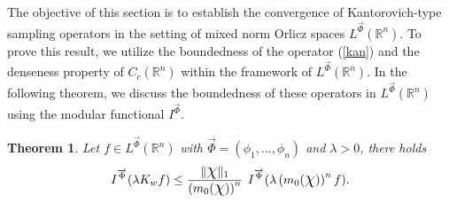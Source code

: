 \documentclass[11pt, a4paper]{article}
\newtheorem{thm}{Theorem}[section]
\theoremstyle{definition}
\numberwithin{equation}{section}
\def\RR{\mathbb R}
\def\Chi{\mbox{\Large$\chi$}}
\begin{document}
The objective of this section is to establish the convergence of Kantorovich-type sampling operators  in the setting of  mixed norm Orlicz spaces $L^{ \overrightarrow{\Phi}}(\RR^n)$. 
To prove this result, we utilize the boundedness of the operator (\ref{kan}) and the denseness property of $C_c(\RR^n)$ within the framework of $L^{ \overrightarrow{\Phi}}(\RR^n)$.
In the following theorem, we discuss the boundedness of these operators in  $L^{ \overrightarrow{\Phi}}(\RR^n)$  using the modular functional $I^{\overrightarrow{\Phi}}.$

\begin{thm}\label{thm 5.1}
    Let $f\in L^{\overrightarrow{\Phi}}(\mathbb{R}^n) $  with $\overrightarrow{\Phi}=(\phi_1,\dots,\phi_n)$ and $\lambda >0$, there holds
    \begin{equation} \label{5.1}
    	I^{\overrightarrow{\Phi}}(\lambda K_wf)\leq \frac{\|\Chi\|_1}{\left( m_{0}(\Chi)\right)^n}\hspace{2pt} \hspace{2pt}I^{ \overrightarrow{\Phi}}(\lambda\left(  m_{0}(\Chi)\right)^nf) .
    \end{equation}
\end{thm}


\end{document}
